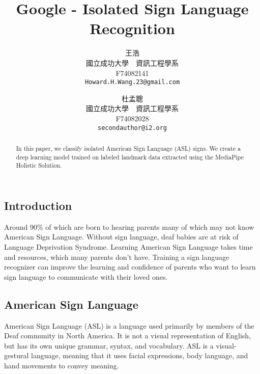 \documentclass[10pt,twocolumn,letterpaper]{article}
\begin{document}
\begin{CJK*}{UTF8}{bsmi}

\title{Google - Isolated Sign Language Recognition}

\author{王浩 \\
國立成功大學　資訊工程學系\\
F74082141\\
{\tt\small Howard.H.Wang.23@gmail.com}
\and
杜孟聰\\
國立成功大學　資訊工程學系\\
F74082028\\
{\tt\small secondauthor@i2.org}
}
\maketitle

\begin{abstract}
   In this paper, we classify isolated American Sign Language (ASL) signs. We create a deep learning model trained on labeled landmark data extracted using the MediaPipe Holistic Solution.
\end{abstract}

\section{Introduction}
\label{sec:intro}
Around $90\%$ of which are born to hearing parents many of which may not know American Sign Language. 
Without sign language, deaf babies are at risk of Language Deprivation Syndrome. 
Learning American Sign Language takes time and resources, which many parents don't have.
Training a sign language recognizer can improve the learning and confidence of parents who want to learn sign language to communicate with their loved ones.

\subsection{American Sign Language}

American Sign Language (ASL) is a language used primarily by members of the Deaf community in North America. 
It is not a visual representation of English, but has its own unique grammar, syntax, and vocabulary. 
ASL is a visual-gestural language, meaning that it uses facial expressions, body language, and hand movements to convey meaning.


\end{CJK*}
\end{document}
